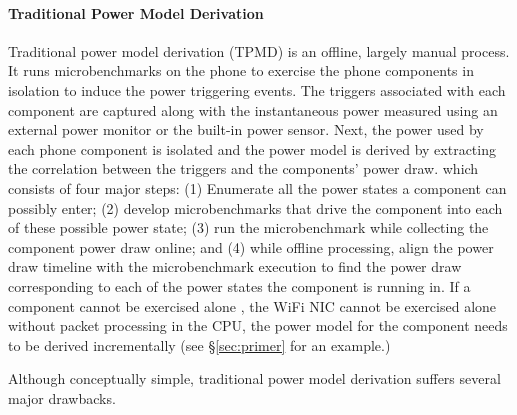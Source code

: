 \paragraph{Traditional Power Model Derivation}
\label{subsec:tpmd}
Traditional power model derivation (TPMD) is an offline, largely manual process. 
It runs microbenchmarks on the phone to exercise the phone components 
in isolation to induce the power triggering events. The triggers 
associated with each component are captured along with the 
instantaneous power measured using an external power monitor 
or the built-in power sensor. Next, the power used by each 
phone component is isolated and the power model is derived 
by extracting the correlation between the triggers and the components’ power draw.
\fi
which consists of four major steps: (1) Enumerate all the 
power states a component can possibly enter; (2) develop 
microbenchmarks that drive the component into each of these 
possible power state; (3) run the microbenchmark while collecting 
the component power draw online; and (4) while offline processing, 
align the power draw timeline with the microbenchmark execution 
to find the power draw corresponding to each of the power states 
the component is running in. If a component cannot be exercised alone
, \eg the WiFi NIC cannot be exercised alone without packet 
processing in the CPU, the power model for the component needs 
to be derived incrementally (see \S\ref{sec:primer} for an example.)

Although conceptually simple, traditional power model derivation suffers several major drawbacks. 



